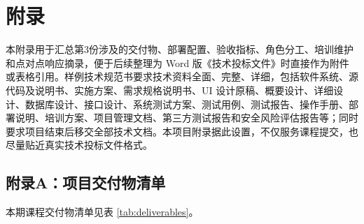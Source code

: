 \section{附录}

本附录用于汇总第3份涉及的交付物、部署配置、验收指标、角色分工、培训维护和点对点响应摘录，便于后续整理为 Word 版《技术投标文件》时直接作为附件或表格引用。样例技术规范书要求技术资料全面、完整、详细，包括软件系统、源代码及说明书、实施方案、需求规格说明书、UI 设计原稿、概要设计、详细设计、数据库设计、接口设计、系统测试方案、测试用例、测试报告、操作手册、部署说明、培训方案、项目管理文档、第三方测试报告和安全风险评估报告等；同时要求项目结束后移交全部技术文档。本项目附录据此设置，不仅服务课程提交，也尽量贴近真实技术投标文件格式。

\subsection{附录A：项目交付物清单}

本期课程交付物清单见表 \ref{tab:deliverables}。


